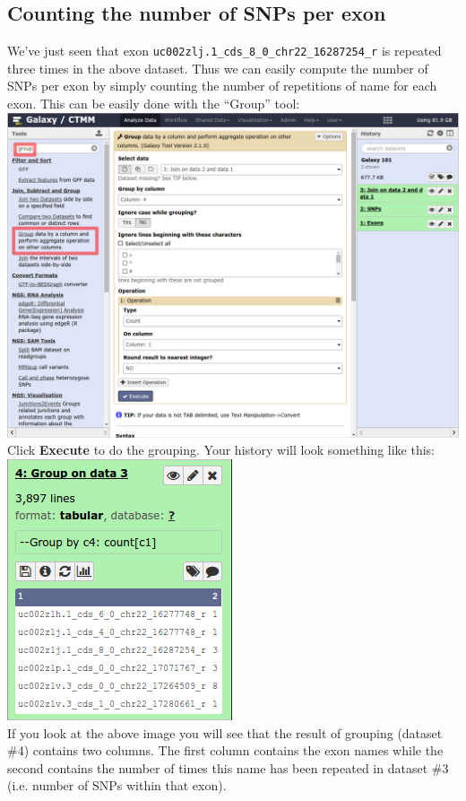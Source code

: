 \documentclass[11pt,a4paper]{article}
\begin{document}
\subsection{Counting the number of SNPs per exon}
We've just seen that exon \verb|uc002zlj.1_cds_8_0_chr22_16287254_r| is repeated three times in the above dataset. Thus we can easily compute the number of SNPs per exon by simply counting the number of repetitions of name for each exon. This can be easily done with the ``Group'' tool:\\
\includegraphics[width=\textwidth]{figures/101_13}\\
Click \textbf{Execute} to do the grouping. Your history will look something like this:\\
\includegraphics[scale=0.65]{figures/101_14}\\
If you look at the above image you will see that the result of grouping (dataset \#4) contains two columns. The first column contains the exon names while the second contains the number of times this name has been repeated in dataset \#3 (i.e. number of SNPs within that exon).
\end{document}
